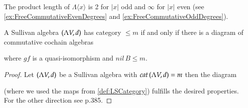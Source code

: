 \begin{Example}
 The product length of $\Lambda \langle x \rangle$ is 2 for $|x|$ odd and $\infty$ for $|x|$ even
 (see \ref{ex:FreeCommutativeEvenDegrees} and \ref{ex:FreeCommutativeOddDegrees}).
\end{Example}

\begin{Proposition}
  A Sullivan algebra $(\Lambda V,d)$ has category $ \leq m$ if and only if there is a diagram of commutative cochain
  algebras 
  
  \centerline{
  }
  
  where $gf$ is a quasi-isomorphism and $nil \,B \leq m$.
\end{Proposition}

\begin{proof}

 Let $(\Lambda V,d)$ be a Sullivan algebra with $cat \, (\Lambda V,d) = m$ then the diagram 

  \centerline{
  }
(where we used the maps from \ref{def:LSCategory}) fulfills the desired properties.
For the other direction see \cite{Felix2001} p.385.

% 
% 
 
\end{proof}

